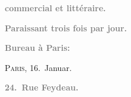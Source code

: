 \pstart
           \begin{otherlanguage}{french}\textcolor{gray}{\textbf{commercial et littéraire.}}\end{otherlanguage}\pend
           
\pstart
           \begin{otherlanguage}{french}\textcolor{gray}{\textbf{\textbf{Paraissant trois fois par jour.}}}\end{otherlanguage}\pend
           
\pstart
           \begin{otherlanguage}{french}\textcolor{gray}{\textbf{\textbf{Bureau à Paris:}}}\end{otherlanguage}\hfill \textsc{Paris}, 16. Januar.\pend
           
\pstart
           \begin{otherlanguage}{french}\textcolor{gray}{\textbf{\textbf{24. Rue Feydeau.}}}\end{otherlanguage}\pend
           
